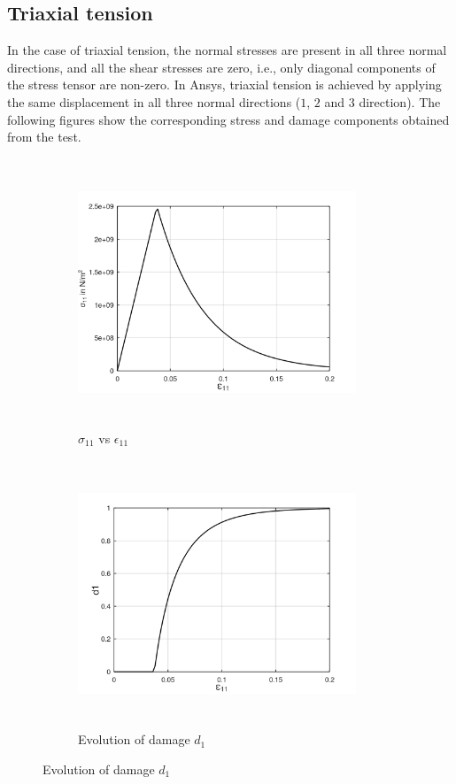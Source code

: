 \documentclass[12pt]{report}
\begin{document}
\subsection{Triaxial tension}
\indent\indent\indent In the case of triaxial tension, the normal stresses are present in all three normal directions, and all the shear stresses are zero, i.e., only diagonal components of the stress tensor are non-zero.  In Ansys, triaxial tension is achieved by applying the same displacement in all three normal directions ($1$, $2$ and $3$ direction). The following figures show the corresponding stress and damage components obtained from the test.\\

\begin{figure}[htbp!]
       \captionsetup[subfigure]{justification=centering}
     \begin{subfigure}{0.4\textwidth}
         \includegraphics[width=8.3cm,height=8cm,keepaspectratio]{24.S11vsE11.png}
         \caption{$\sigma_{11}$ vs $\epsilon_{11}$}
         \label{fig:S11vsE11 2}
     \end{subfigure}
     \hspace{1.8cm}
     \captionsetup[subfigure]{justification=centering}
     \begin{subfigure}{0.4\textwidth}
         \includegraphics[width=8.3cm,height=8cm,keepaspectratio]{24.d1.png}
         \caption{Evolution of damage $d_{1}$}
         \label{fig:Evolution of damage d1 2}
     \end{subfigure}
\end{figure}
\end{document}
